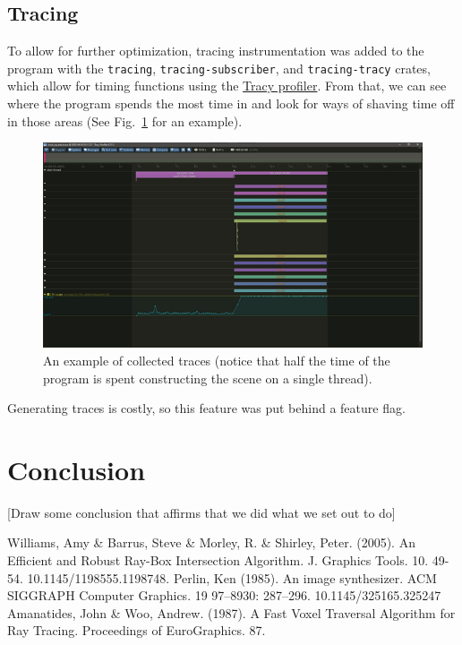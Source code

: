 \documentclass[conference]{IEEEtran}
\begin{document}
\subsection{Tracing}

To allow for further optimization, tracing instrumentation was added to the program with the \verb|tracing|, \verb|tracing-subscriber|, and \verb|tracing-tracy| crates, which allow for timing functions using the \href{https://github.com/wolfpld/tracy}{Tracy profiler}.
From that, we can see where the program spends the most time in and look for ways of shaving time off in those areas (See Fig.~\ref{tracing} for an example).

\begin{figure}[htbp]
\centerline{\includegraphics[width=\linewidth]{tracing}}
\caption{An example of collected traces (notice that half the time of the program is spent constructing the scene on a single thread).}
\label{tracing}
\end{figure}

Generating traces is costly, so this feature was put behind a feature flag.

\section{Conclusion}

[Draw some conclusion that affirms that we did what we set out to do]

\begin{thebibliography}{00}
 Williams, Amy \& Barrus, Steve \& Morley, R. \& Shirley, Peter. (2005). An Efficient and Robust Ray-Box Intersection Algorithm. J. Graphics Tools. 10. 49-54. 10.1145/1198555.1198748.
 Perlin, Ken (1985). An image synthesizer. ACM SIGGRAPH Computer Graphics. 19 97–8930: 287–296. 10.1145/325165.325247
 Amanatides, John \& Woo, Andrew. (1987). A Fast Voxel Traversal Algorithm for Ray Tracing. Proceedings of EuroGraphics. 87.
\end{thebibliography}
\end{document}
